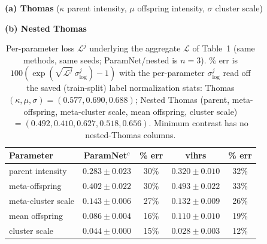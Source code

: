 \documentclass[11pt,a4paper]{article}
\begin{document}
\begin{table}[htbp]
\centering
\footnotesize
\textbf{(a) Thomas} ($\kappa$ parent intensity, $\mu$ offspring intensity, $\sigma$ cluster scale)\\[2pt]

\vspace{10pt}
\textbf{(b) Nested Thomas}\\[2pt]
\begin{tabular}{lcccc}
\toprule
Parameter & ParamNet$^{c}$ & \% err & vihrs & \% err \\
\midrule
parent intensity      & $0.283 \pm 0.023$ & 30\% & $0.320 \pm 0.010$ & 32\% \\
meta-offspring        & $0.402 \pm 0.022$ & 30\% & $0.493 \pm 0.022$ & 33\% \\
meta-cluster scale    & $0.143 \pm 0.006$ & 27\% & $0.132 \pm 0.009$ & 26\% \\
mean offspring        & $0.086 \pm 0.004$ & 16\% & $0.110 \pm 0.010$ & 19\% \\
cluster scale         & $0.044 \pm 0.000$ & 15\% & $0.028 \pm 0.003$ & 12\% \\
\bottomrule
\end{tabular}
\caption{Per-parameter loss $\mathcal{L}^j$ underlying the aggregate
$\mathcal{L}$ of Table~1 (same methods, same
seeds; ParamNet/nested is $n{=}3$). \% err is
$100(\exp(\sqrt{\mathcal{L}^j}\,\sigma_{\log}^j) - 1)$ with the
per-parameter $\sigma_{\log}^j$ read off the saved (train-split) label
normalization stats: Thomas $(\kappa,\mu,\sigma) = (0.577, 0.690, 0.688)$;
Nested Thomas (parent, meta-offspring, meta-cluster scale, mean offspring,
cluster scale) $=(0.492, 0.410, 0.627, 0.518, 0.656)$. Minimum
contrast has no nested-Thomas columns.}
\label{tab:perparam-pct}
\end{table}
\end{document}
